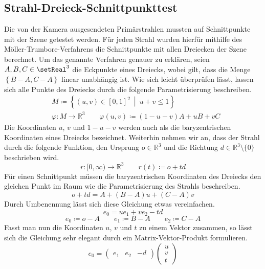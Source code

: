 \documentclass[crop=false]{standalone}
\begin{document}
    \subsection{Strahl-Dreieck-Schnittpunkttest} %
    \label{sub:strahl_dreieck_schnittpunkttest}
      Die von der Kamera ausgesendeten Primärstrahlen mussten auf Schnittpunkte mit der Szene getestet werden.
      Für jeden Strahl wurden hierfür mithilfe des Möller-Trumbore-Verfahrens die Schnittpunkte mit allen Dreiecken der Szene berechnet.
      Um das genannte Verfahren genauer zu erklären, seien $A,B,C\in \setReal^3$ die Eckpunkte eines Dreiecks, wobei gilt, dass die Menge $\left\{ B-A,C-A \right\}$ linear unabhängig ist.
      Wie sich leicht überprüfen lässt, lassen sich alle Punkte des Dreiecks durch die folgende Parametrisierung beschreiben.
      \begin{align*}
        &M \coloneqq \left\{ (u,v)\in [0,1]^2 \ \middle|\ u+v \leq 1 \right\} \\
        &\varphi\colon M\to \mathds{R}^3 \qquad \varphi(u,v)\coloneqq (1-u-v)A + uB + vC
      \end{align*}
      Die Koordinaten $u$, $v$ und $1-u-v$ werden auch als die baryzentrischen Koordinaten eines Dreiecks bezeichnet.
      Weiterhin nehmen wir an, dass der Strahl durch die folgende Funktion, den Ursprung $o\in\mathds{R}^3$ und die Richtung $d\in\mathds{R}^3\setminus\{0\}$ beschrieben wird.
      \[
        r\colon [0,\infty) \to \mathds{R}^3
        \qquad
        r(t) \coloneqq o + td
      \]
      Für einen Schnittpunkt müssen die baryzentrischen Koordinaten des Dreiecks den gleichen Punkt im Raum wie die Parametrisierung des Strahls beschreiben.
      \[
        o + td = A + (B-A)u + (C-A)v
      \]
      Durch Umbenennung lässt sich diese Gleichung etwas vereinfachen.
      \[
        e_0 = ue_1 + ve_2 - td
      \]
      \[
        e_0 \coloneqq o - A
        \qquad
        e_1 \coloneqq B-A
        \qquad
        e_2 \coloneqq C-A
      \]
      Fasst man nun die Koordinaten $u$, $v$ und $t$ zu einem Vektor zusammen, so lässt sich die Gleichung sehr elegant durch ein Matrix-Vektor-Produkt formulieren.
      \[
        e_0 =
        \begin{pmatrix}
          e_1 &
          e_2 &
          -d
        \end{pmatrix}
        \begin{pmatrix}
          u \\
          v \\
          t
        \end{pmatrix}
      \]
\end{document}
